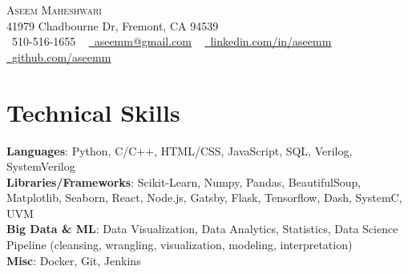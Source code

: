\documentclass[letterpaper,11pt]{article}
\begin{document}

\begin{center}
    {\Huge \scshape Aseem Maheshwari} \\ \vspace{1pt}
    41979 Chadbourne Dr, Fremont, CA 94539 \\ \vspace{1pt}
    \small \raisebox{-0.1\height}\faPhone\ 510-516-1655 ~ \href{mailto:aseemm@gmail.com}{\raisebox{-0.2\height}\faEnvelope\  \underline{aseemm@gmail.com}} ~ 
    \href{https://linkedin.com/in/aseemm/}{\raisebox{-0.2\height}\faLinkedin\ \underline{linkedin.com/in/aseemm}}  ~
    \href{https://github.com/aseemm}{\raisebox{-0.2\height}\faGithub\ \underline{github.com/aseemm}}
    \vspace{-8pt}
\end{center}

\section{Technical Skills}
 \begin{itemize}[leftmargin=0.15in, label={}]
    \small{\item{
     \textbf{Languages}{: Python, C/C++, HTML/CSS, JavaScript, SQL, Verilog, SystemVerilog} \\
     \textbf{Libraries/Frameworks}{: Scikit-Learn, Numpy, Pandas, BeautifulSoup, Matplotlib, Seaborn, React, Node.js, Gatsby, Flask, Tensorflow, Dash, SystemC, UVM} \\
     \textbf{Big Data \& ML}{: Data Visualization, Data Analytics, Statistics, Data Science Pipeline (cleansing, wrangling, visualization, modeling, interpretation)} \\
     \textbf{Misc}{: Docker, Git, Jenkins} \\
    }}
 \end{itemize}
 \vspace{-16pt}
\end{document}
